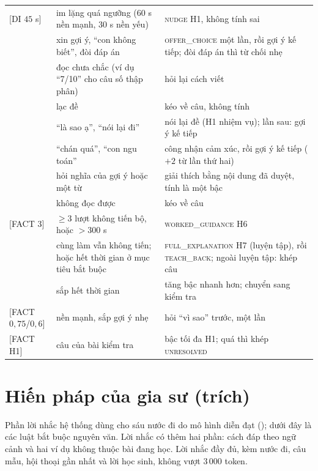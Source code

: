 \begin{center}
\begin{tabularx}{\linewidth}{@{}>{\raggedright\arraybackslash}p{3.2cm}YY@{}}
 [DI $45$ s] & im lặng quá ngưỡng (60 s nền mạnh, 30 s nền yếu) & \textsc{nudge} H1, không tính sai \\
 & xin gợi ý, ``con không biết'', đòi đáp án & \textsc{offer\_choice} một lần, rồi gợi ý kế tiếp; đòi đáp án thì từ chối nhẹ \\
 & đọc chưa chắc (ví dụ ``7/10'' cho câu số thập phân) & hỏi lại cách viết \\
 & lạc đề & kéo về câu, không tính \\
 & ``là sao ạ'', ``nói lại đi'' & nói lại đề (H1 nhiệm vụ); lần sau: gợi ý kế tiếp \\
 & ``chán quá'', ``con ngu toán'' & công nhận cảm xúc, rồi gợi ý kế tiếp ($+2$ từ lần thứ hai) \\
 & hỏi nghĩa của gợi ý hoặc một từ & giải thích bằng nội dung đã duyệt, tính là một bậc \\
 & không đọc được & kéo về câu \\
 [FACT $3$] & $\ge3$ lượt không tiến bộ, hoặc $>300$ s & \textsc{worked\_guidance} H6 \\
 & cùng làm vẫn không tiến; hoặc hết thời gian ở mục tiêu bắt buộc & \textsc{full\_explanation} H7 (luyện tập), rồi \textsc{teach\_back}; ngoài luyện tập: khép câu \\
 & sắp hết thời gian & tăng bậc nhanh hơn; chuyển sang kiểm tra \\
 [FACT $0{,}75$/$0{,}6$] & nền mạnh, sắp gợi ý nhẹ & hỏi ``vì sao'' trước, một lần \\
 [FACT H1] & câu của bài kiểm tra & bậc tối đa H1; quá thì khép \textsc{unresolved} \\
\bottomrule
\end{tabularx}
\end{center}

\section{Hiến pháp của gia sư (trích)}\label{app:prompt}

Phần lời nhắc hệ thống dùng cho sáu nước đi do mô hình diễn đạt (); dưới đây là các luật bắt buộc nguyên văn. Lời nhắc có thêm hai phần: cách đáp theo ngữ cảnh và hai ví dụ không thuộc bài đang học. Lời nhắc đầy đủ, kèm nước đi, câu mẫu, hội thoại gần nhất và lời học sinh, không vượt $3\,000$ token.

